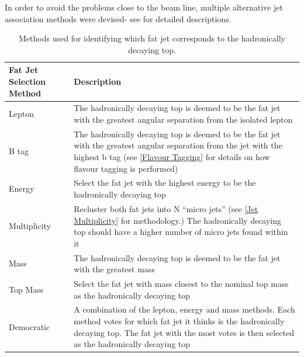 In order to avoid the problems close to the beam line, multiple alternative jet association methods were devised- see  for detailed descriptions.
\begin{table}
  \centering
  \begin{tabular}{l |p{100mm}}
    \toprule
    Fat Jet Selection Method     & Description  \\
    \midrule
    Lepton & The hadronically decaying top is deemed to be the fat jet with the greatest angular separation from the isolated lepton\\
    \midrule
    B tag & The hadronically decaying top is deemed to be the fat jet with the greatest angular separation from the jet with the highest b tag (see \ref{Flavour Tagging} for details on how flavour tagging is performed)\\
    \midrule
    Energy & Select the fat jet with the highest energy to be the hadronically decaying top\\
    \midrule
    Multiplicity & Recluster both fat jets into N ``micro jets'' (see \ref{Jet Multiplicity} for methodology.) The hadronically decaying top should have a higher number of micro jets found within it\\
    \midrule
    Mass & The hadronically decaying top is deemed to be the fat jet with the greatest mass \\
    \midrule
    Top Mass & Select the fat jet with mass closest to the nominal top mass as the hadronically decaying top \\
    \midrule
    Democratic & A combination of the lepton, energy and mass methods. Each method votes for which fat jet it thinks is the hadronically decaying top. The fat jet with the most votes is then selected as the hadronically decaying top  \\
    \bottomrule
  \end{tabular}
  \caption{Methods used for identifying which fat jet corresponds to the hadronically decaying top.}
  \label{tab:methodDescription}
\end{table}


